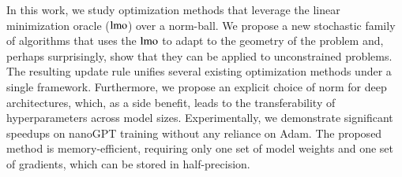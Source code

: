 In this work, we study optimization methods that leverage the linear minimization oracle ($\operatorname{lmo}$) over a norm-ball. We propose a new stochastic family of algorithms that uses the $\operatorname{lmo}$ to adapt to the geometry of the problem and, perhaps surprisingly, show that they can be applied to unconstrained problems. The resulting update rule unifies several existing optimization methods under a single framework. Furthermore, we propose an explicit choice of norm for deep architectures, which, as a side benefit, leads to the transferability of hyperparameters across model sizes. Experimentally, we demonstrate significant speedups on nanoGPT training without any reliance on Adam. The proposed method is memory-efficient, requiring only one set of model weights and one set of gradients, which can be stored in half-precision.
